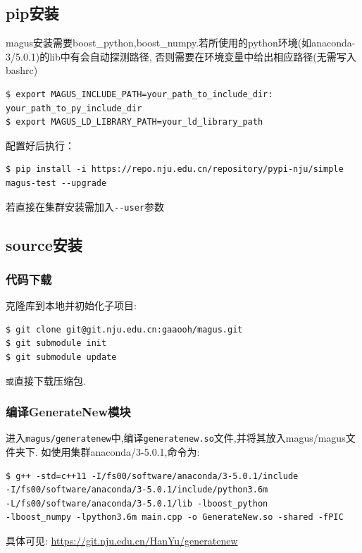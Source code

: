 \documentclass[12pt]{article}
\newcommand{\file}[1]{\texttt{#1}}
\begin{document}
\subsection{pip安装}
magus安装需要boost\_python,boost\_numpy.若所使用的python环境(如anaconda-3/5.0.1)的lib中有会自动探测路径,
否则需要在环境变量中给出相应路径(无需写入bashrc)
\begin{tcolorbox}
    \begin{verbatim}
$ export MAGUS_INCLUDE_PATH=your_path_to_include_dir: your_path_to_py_include_dir
$ export MAGUS_LD_LIBRARY_PATH=your_ld_library_path
    \end{verbatim}
\end{tcolorbox}
配置好后执行：
\begin{tcolorbox}
    \begin{verbatim}
$ pip install -i https://repo.nju.edu.cn/repository/pypi-nju/simple magus-test --upgrade
    \end{verbatim}
\end{tcolorbox}

  若直接在集群安装需加入\verb|--user|参数
\subsection{source安装}
\subsubsection{代码下载}
克隆库到本地并初始化子项目:
\begin{tcolorbox}
    \begin{verbatim}
$ git clone git@git.nju.edu.cn:gaaooh/magus.git
$ git submodule init
$ git submodule update
    \end{verbatim}
\end{tcolorbox}
\texttt 
或直接下载压缩包.
\subsubsection{编译GenerateNew模块}
进入\file{magus/generatenew}中,编译\file{generatenew.so}文件,并将其放入magus/magus文件夹下.
如使用集群anaconda/3-5.0.1,命令为:
\begin{tcolorbox}
    \begin{verbatim}
$ g++ -std=c++11 -I/fs00/software/anaconda/3-5.0.1/include 
-I/fs00/software/anaconda/3-5.0.1/include/python3.6m 
-L/fs00/software/anaconda/3-5.0.1/lib -lboost_python 
-lboost_numpy -lpython3.6m main.cpp -o GenerateNew.so -shared -fPIC
    \end{verbatim}
\end{tcolorbox}
具体可见:
\textcolor{blue}{\url{https://git.nju.edu.cn/HanYu/generatenew}}
\end{document}
